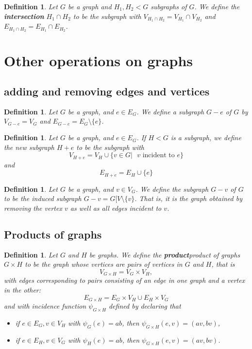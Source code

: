 \documentclass[12pt]{report}
\theoremstyle{plain}
\newtheorem{defn}[thm]{Definition}
\begin{document}
\begin{defn} \label{intersection definition}
Let $G$ be a graph and $H_1, H_2 < G$ subgraphs of $G$. We define the
\textbf{intersection} $H_1 \cap
H_2$ to be the subgraph with $V_{H_1 \cap H_2} = V_{H_1} \cap V_{H_2}$ and
$E_{H_1 \cap H_2} = E_{H_1} \cap E_{H_2}$. 
\end{defn}

\section{Other operations on graphs}

\subsection{adding and removing edges and vertices}

\begin{defn}
Let $G$ be a graph, and $e \in E_G$. We define a subgraph $G - e$ of $G$ by
$V_{G - e} = V_G$ and $E_{G - e} = E_G \setminus \{e\}$.
\end{defn}

\begin{defn}
Let $G$ be a graph, and $e \in E_G$. If $H < G$ is a subgraph, we define
the new subgraph $H + e$ to be the subgraph with
\[V_{H + e} = V_H \cup \{v \in G | \text{ $v$ incident to $e$}\}\]
and
\[E_{H + e} = E_H \cup \{e\}\]
\end{defn}

\begin{defn}
Let $G$ be a graph, and $v \in V_G$. We define the subgraph $G - v$ of $G$
to be the induced subgraph $G - v = G[V \setminus \{v \}$. That is, it is
the graph obtained by removing the vertex $v$ as well as all edges incident
to $v$.
\end{defn}

\subsection{Products of graphs}

\begin{defn}
Let $G$ and $H$ be graphs. We define the \textbf{product}{product of
graphs} $G \times H$ to be the graph whose vertices are pairs of vertices
in $G$ and $H$, that is
\[V_{G \times H} = V_G \times V_H,\]
with edges corresponding to pairs consisting of an edge in one graph and a
vertex in the other:
\[E_{G \times H} = E_G \times V_H \cup E_H \times V_G\]
and with incidence function $\psi_{G \times H}$ defined by declaring that
\begin{itemize}
\item if $e \in E_G, v \in V_H$ with $\psi_G(e) = ab$, then $\psi_{G \times
H}(e,v) = (av,bv)$,
\item if $e \in E_H, v \in V_G$ with $\psi_H(e) = ab$, then $\psi_{G \times
H}(e,v) = (av,bv)$.
\end{itemize}
\end{defn}
\end{document}
